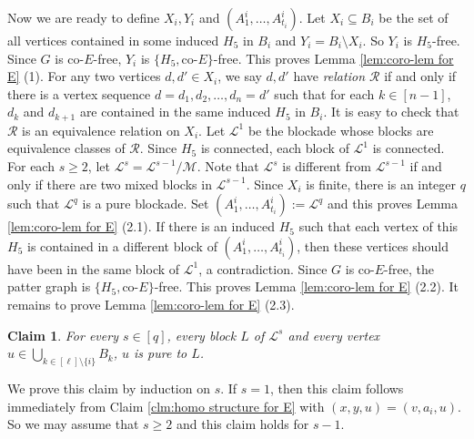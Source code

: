 \documentclass[a4paper,11pt]{article}
\newtheorem{claim}{Claim}[theorem]
\let\oldendproof\endproof
\renewenvironment{proof}[1][\proofname]{%
	\oldproof[\normalfont\bfseries #1]%
}{\oldendproof}
\renewcommand{\qedsymbol}{$\square$}%
\newenvironment{subproof}[1][\normalfont\it Subproof]{%
	\renewcommand{\qedsymbol}{{\tiny{$\blacksquare$}}}%
	\begin{proof}[#1]%
	}{%
	\end{proof}%
}
\begin{document}
\begin{proof}
        Now we are ready to define $X_i,Y_i$ and $(A^i_1,\ldots, A^i_{t_i})$. 
        Let $X_i\subseteq B_i$ be the set of all vertices contained in some induced $H_5$ in $B_i$ and $Y_i=B_i\setminus X_i$. So $Y_i$ is $H_5$-free.
        Since $G$ is co-$E$-free, $Y_i$ is $\{H_5,\text{co-}E\}$-free.  
        This proves Lemma \ref{lem:coro-lem for E} (1). 
        For any two vertices $d,d'\in X_i$, we say $d,d'$ have {\em relation $\mathcal{R}$} if and only if there is a vertex sequence $d=d_1,d_2,\ldots,d_n=d'$ such that for each $k\in [n-1]$, $d_k$ and $d_{k+1}$ are contained in the same induced $H_5$ in $B_i$. 
        It is easy to check that $\mathcal{R}$ is an equivalence relation on $X_i$. 
        Let $\mathcal{L}^1$ be the blockade whose blocks are equivalence classes of $\mathcal{R}$. 
        Since $H_5$ is connected, each block of $\mathcal{L}^1$ is connected.
        For each $s\geq 2$, let $\mathcal{L}^{s}=\mathcal{L}^{s-1}/\mathcal{M}$. 
        Note that $\mathcal{L}^{s}$ is different from $\mathcal{L}^{s-1}$ if and only if there are two mixed blocks in $\mathcal{L}^{s-1}$.
        Since $X_i$ is finite, there is an integer $q$ such that $\mathcal{L}^{q}$ is a pure blockade. 
        Set $(A^i_1,\ldots, A^i_{t_i}):=\mathcal{L}^{q}$ and  
        this proves Lemma \ref{lem:coro-lem for E} (2.1). 
        If there is an induced $H_5$ such that each vertex of this $H_5$ is contained in a different block of $(A^i_1,\ldots,A^i_{t_i})$, then these vertices should have been in the same block of $\mathcal{L}^1$, a contradiction. Since $G$ is co-$E$-free, the patter graph is $\{H_5,\text{co-}E\}$-free.
        This proves Lemma \ref{lem:coro-lem for E} (2.2).
        It remains to prove Lemma \ref{lem:coro-lem for E} (2.3).
      
        \begin{claim}\label{clm:homo blocks for E}
            For every $s\in[q]$, every block $L$ of $\mathcal{L}^s$ and every vertex $u\in \bigcup_{k\in [\ell]\setminus \{i\}} B_k$, $u$ is pure to $L$.
        \end{claim}
        \begin{subproof}[Proof of Claim \ref{clm:homo blocks for E}]
            We prove this claim by induction on $s$. 
            If $s=1$, then this claim follows immediately from Claim \ref{clm:homo structure for E} with $(x,y,u)=(v,a_i,u)$. 
            So we may assume that $s\ge 2$ and this claim holds for $s-1$.


\end{subproof}
\end{proof}
\end{document}
